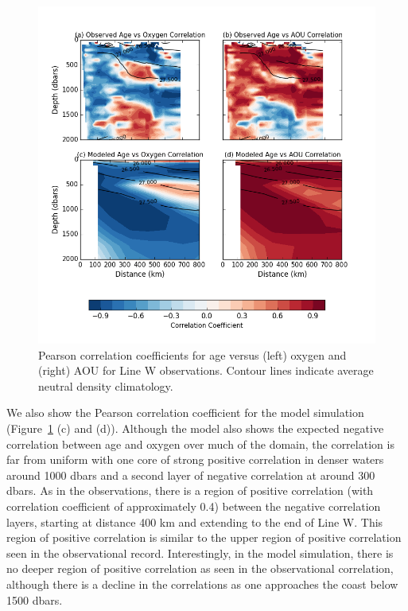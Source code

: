 \begin{figure}
\centering
\includegraphics[width=\linewidth]{correlation.png}
\caption{Pearson correlation coefficients for age versus (left) oxygen and (right)
AOU for Line W observations. Contour lines indicate average neutral density climatology.}
\label{fig:correlations}
\end{figure}

We also show the Pearson correlation coefficient for the model simulation
(Figure~\ref{fig:correlations} (c) and (d)). Although the model also shows the
expected negative correlation between age and oxygen over much of the domain,
the correlation is far from uniform with one core of strong positive correlation
in denser waters around 1000 dbars and a second layer of negative correlation at
around 300 dbars.  As in the observations, there is a region of positive correlation
(with correlation coefficient of approximately 0.4) between the negative correlation
layers, starting at distance 400 km and extending to the end of Line W. This region
of positive correlation is similar to the upper region of positive correlation seen
in the observational record. Interestingly, in the model simulation, there is no
deeper region of positive correlation as seen in the observational correlation,
although there is a decline in the correlations as one approaches the coast below
1500 dbars.

